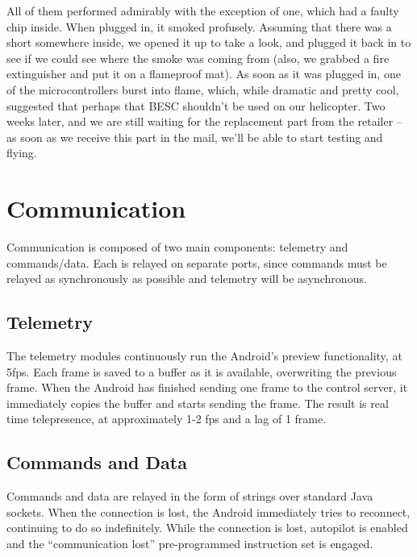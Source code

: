 \documentclass[letterpaper]{article}
\begin{document}
All of them performed admirably with the exception of one, which had a
faulty chip inside. When plugged in, it smoked profusely. Assuming
that there was a short somewhere inside, we opened it up to take a
look, and plugged it back in to see if we could see where the smoke
was coming from (also, we grabbed a fire extinguisher and put it on a
flameproof mat). As soon as it was plugged in, one of the
microcontrollers burst into flame, which, while dramatic and pretty
cool, suggested that perhaps that BESC shouldn't be used on our
helicopter. Two weeks later, and we are still waiting for the
replacement part from the retailer -- as soon as we receive this part
in the mail, we'll be able to start testing and flying.

\section{Communication}
Communication is composed of two main components:‭ ‬telemetry and
commands/data.‭ ‬Each is relayed on separate ports,‭ ‬since commands must
be relayed as synchronously as possible and telemetry will be
asynchronous.

\subsection{Telemetry}
The telemetry modules continuously run the Android's preview
functionality,‭ ‬at‭ ‬5fps.‭  ‬Each frame is saved to a buffer as it is
available,‭ ‬overwriting the previous frame.‭  ‬When the Android has
finished sending one frame to the control server,‭ ‬it immediately
copies the buffer and starts sending the frame.‭  ‬The result is real
time telepresence,‭ ‬at approximately‭ ‬1-2‭ ‬fps and a lag of‭ ‬1‭ ‬frame.

\subsection{Commands and Data}
Commands and data are relayed in the form of strings over standard
Java sockets.‭ ‬When the connection is lost,‭ ‬the Android immediately
tries to reconnect,‭ ‬continuing to do so indefinitely.‭ ‬While the
connection is lost,‭ ‬autopilot is enabled and the‭ “‬communication lost‭”
‬pre-programmed instruction set is engaged.
\end{document}
